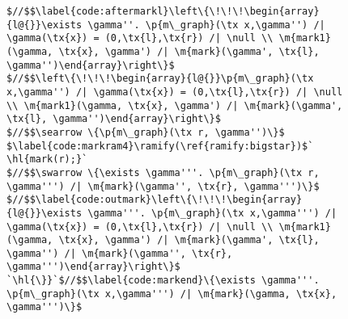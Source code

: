 \begin{figure}[t]
\begin{lstlisting}[multicols=2]
$//$$\label{code:aftermarkl}\left\{\!\!\!\begin{array}{l@{}}\exists \gamma''. \p{m\_graph}(\tx x,\gamma'') /| \gamma(\tx{x}) = (0,\tx{l},\tx{r}) /| \null \\ \m{mark1}(\gamma, \tx{x}, \gamma') /| \m{mark}(\gamma', \tx{l}, \gamma'')\end{array}\right\}$
$//$$\left\{\!\!\!\begin{array}{l@{}}\p{m\_graph}(\tx x,\gamma'') /| \gamma(\tx{x}) = (0,\tx{l},\tx{r}) /| \null \\ \m{mark1}(\gamma, \tx{x}, \gamma') /| \m{mark}(\gamma', \tx{l}, \gamma'')\end{array}\right\}$
$//$$\searrow \{\p{m\_graph}(\tx r, \gamma'')\}$
$\label{code:markram4}\ramify(\ref{ramify:bigstar})$` \hl{mark(r);}`
$//$$\swarrow \{\exists \gamma'''. \p{m\_graph}(\tx r, \gamma''') /| \m{mark}(\gamma'', \tx{r}, \gamma''')\}$
$//$$\label{code:outmark}\left\{\!\!\!\begin{array}{l@{}}\exists \gamma'''. \p{m\_graph}(\tx x,\gamma''') /| \gamma(\tx{x}) = (0,\tx{l},\tx{r}) /| \null \\ \m{mark1}(\gamma, \tx{x}, \gamma') /| \m{mark}(\gamma', \tx{l}, \gamma'') /| \m{mark}(\gamma'', \tx{r}, \gamma''')\end{array}\right\}$
`\hl{\}}`$//$$\label{code:markend}\{\exists \gamma'''. \p{m\_graph}(\tx x,\gamma''') /| \m{mark}(\gamma, \tx{x}, \gamma''')\}$
\end{lstlisting}


\end{figure}
